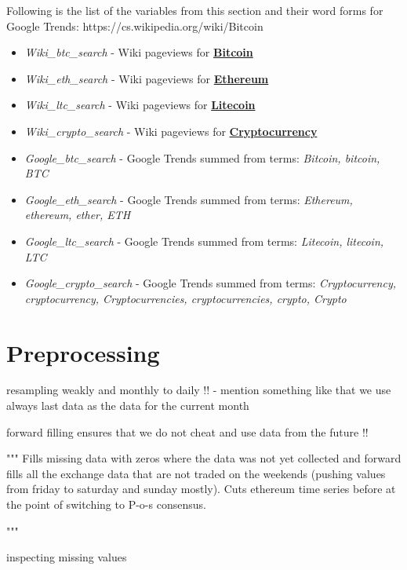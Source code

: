 Following is the list of the variables from this section and their word forms
for Google Trends:
https://cs.wikipedia.org/wiki/Bitcoin
\begin{itemize}
    \item \textit{Wiki\_btc\_search} - Wiki pageviews for \textbf{\href{https://cs.wikipedia.org/wiki/Bitcoin}{Bitcoin}}
    \item \textit{Wiki\_eth\_search} - Wiki pageviews for \textbf{\href{https://cs.wikipedia.org/wiki/Ethereum}{Ethereum}}
    \item \textit{Wiki\_ltc\_search} - Wiki pageviews for \textbf{\href{https://cs.wikipedia.org/wiki/Litecoin}{Litecoin}}
    \item \textit{Wiki\_crypto\_search} - Wiki pageviews for \textbf{\href{https://en.wikipedia.org/wiki/Cryptocurrency}{Cryptocurrency}}
    \item \textit{Google\_btc\_search} - Google Trends summed from terms: \textit{Bitcoin, bitcoin, BTC}
    \item \textit{Google\_eth\_search} - Google Trends summed from terms: \textit{Ethereum, ethereum, ether, ETH}
    \item \textit{Google\_ltc\_search} - Google Trends summed from terms: \textit{Litecoin, litecoin, LTC}
    \item \textit{Google\_crypto\_search} - Google Trends summed from terms: \textit{Cryptocurrency, cryptocurrency, Cryptocurrencies, cryptocurrencies, crypto, Crypto}
\end{itemize}


\section{Preprocessing}

resampling weakly and monthly to daily !!
- mention something like that we use always last data as the data for the current month

forward filling ensures that we do not cheat and use data from the future !!


"""
Fills missing data with zeros where the data was not yet collected and 
forward fills all the exchange data that are not traded on the weekends 
(pushing values from friday to saturday and sunday mostly).
Cuts ethereum time series before at the point of switching to P-o-s consensus.

"""

inspecting missing values




